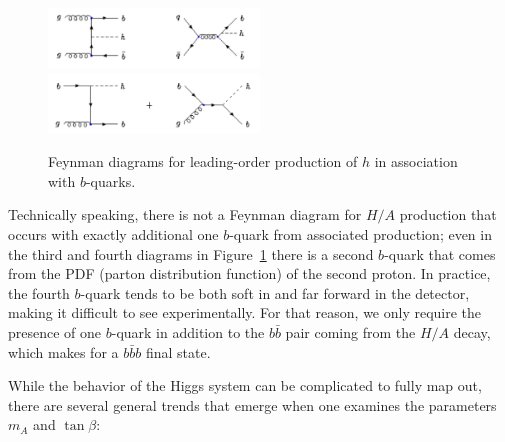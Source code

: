 \begin{figure}[H]
	\includegraphics[width=0.5\textwidth]{Theory/FeynmanDiagrams/bbH_FeynmanDiagrams.pdf}		
	\includegraphics[width=0.5\textwidth]{Theory/FeynmanDiagrams/bH_FeynmanDiagrams.pdf}
	\caption{Feynman diagrams for leading-order production of $h$ in association with $b$-quarks.  \label{fig:fd}}
\end{figure}

Technically speaking, there is not a Feynman diagram for $H/A$ 
production that occurs with exactly additional one $b$-quark from associated production; even in 
the third and fourth diagrams in Figure~\ref{fig:fd} there 
is a second $b$-quark that comes from the PDF (parton distribution 
function) of the second proton.  In practice, the fourth $b$-quark 
tends to be both soft in \pt and far forward in the detector, 
making it difficult to see experimentally.  For that reason, we only require the 
presence of one $b$-quark in addition to the $b\bar{b}$ pair 
coming from the $H/A$ decay, which makes for a $b\bar{b}b$ final state.



While the behavior of the Higgs system can be complicated to fully map out, 
there are several general trends that emerge when one examines the parameters $m_A$ and $\tan\beta$:


